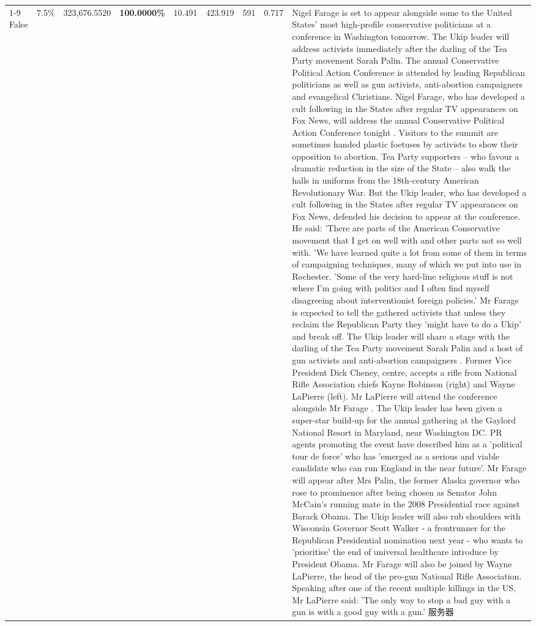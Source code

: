\begin{table}[H]
\begin{tabular}{lllrlllll}
\cline{1-9}
False & 7.5\% & 323,676.5520 & \bfseries \color{red} 100.0000\% & 10.491 & 423.919 & 591 & 0.717 & Nigel Farage is set to appear alongside some to the United States' most high-profile conservative politicians at a conference in Washington tomorrow. The Ukip leader will address activists immediately after the darling of the Tea Party movement Sarah Palin. The annual Conservative Political Action Conference is attended by leading Republican politicians as well as gun activists, anti-abortion campaigners and evangelical Christians. Nigel Farage, who has developed a cult following in the States after regular TV appearances on Fox News, will address the annual Conservative Political Action Conference tonight . Visitors to the summit are sometimes handed plastic foetuses by activists to show their opposition to abortion. Tea Party supporters – who favour a dramatic reduction in the size of the State – also walk the halls in uniforms from the 18th-century American Revolutionary War. But the Ukip leader, who has developed a cult following in the States after regular TV appearances on Fox News, defended his decision to appear at the conference. He said: 'There are parts of the American Conservative movement that I get on well with and other parts not so well with. 'We have learned quite a lot from some of them in terms of campaigning techniques, many of which we put into use in Rochester. 'Some of the very hard-line religious stuff is not where I'm going with politics and I often find myself disagreeing about interventionist foreign policies.' Mr Farage is expected to tell the gathered activists that unless they reclaim the Republican Party they 'might have to do a Ukip' and break off. The Ukip leader will share a stage with the darling of the Tea Party movement Sarah Palin and a host of gun activists and anti-abortion campaigners . Former Vice President Dick Cheney, centre, accepts a rifle from National Rifle Association chiefs Kayne Robinson (right) and Wayne LaPierre (left). Mr LaPierre will attend the conference alongside Mr Farage . The Ukip leader has been given a super-star build-up for the annual gathering at the Gaylord National Resort in Maryland, near Washington DC. PR agents promoting the event have described him as a 'political tour de force' who has 'emerged as a serious and viable candidate who can run England in the near future'. Mr Farage will appear after Mrs Palin, the former Alaska governor who rose to prominence after being chosen as Senator John McCain's running mate in the 2008 Presidential race against Barack Obama. The Ukip leader will also rub shoulders with Wisconsin Governor Scott Walker - a frontrunner for the Republican Presidential nomination next year - who wants to 'prioritise' the end of universal healthcare introduce by President Obama. Mr Farage will also be joined by Wayne LaPierre, the head of the pro-gun National Rifle Association. Speaking after one of the recent multiple killings in the US, Mr LaPierre said: 'The only way to stop a bad guy with a gun is with a good guy with a gun.' 服务器 \\

\end{tabular}
\end{table}
